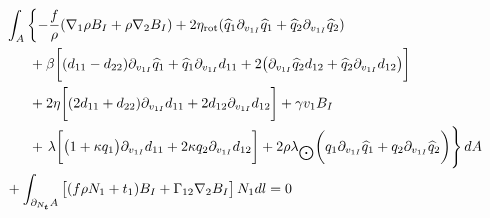 \begin{align}   \label{eq_week_3}
	&  \int_A  \left\{- \frac{f}{\rho} (\nabla_1 \rho B_I +   \rho \nabla_2 B_I ) + 2\eta_{\rm rot} (\widehat{q}_1 \partial_{v_{1I}}\widehat{q}_1 + \widehat{q}_2 \partial_{v_{1I}}\widehat{q}_2 ) \right.\nonumber\\ 
&~~~~~+ \beta \bigg[ (d_{11} - d_{22}) \partial_{v_{1I}}\widehat{q}_1 + \widehat{q}_1 \partial_{v_{1I}} d_{11} +   2\big(\partial_{v_{1I}}\widehat{q}_2d_{12} + \widehat{q}_2\partial_{v_{1I}} d_{12}\big)\bigg]   \nonumber\\
&~~~~~+ 2\eta \bigg[(2d_{11}+   d_{22}) \partial_{v_{1I}} d_{11} +   2d_{12} \partial_{v_{1I}} d_{12}  \bigg]+ \gamma v_1B_I\nonumber \\ 
&~~~~~+\left. \vphantom{\frac{1}{2}} \lambda \bigg[\big( 1 + \kappa q_1\big)\partial_{v_{1I}} d_{11} +   2\kappa q_2  \partial_{v_{1I}} d_{12}\bigg]+ 2\rho
\lambda_{\bigodot} \bigg(q_1 \partial_{v_{1I}} \widehat{q}_{1} + \nonumber  q_2 \partial_{v_{1I}} \widehat{q}_{2} \bigg) \right\}   dA  \nonumber\\
&+  \int_{\partial_{N_{\bm{t}}} A}  \left[(f\rho N_1 + t_1)  B_I + \Gamma_{12} \nabla_2 B_I  \right]N_1 d l =0
\end{align}

